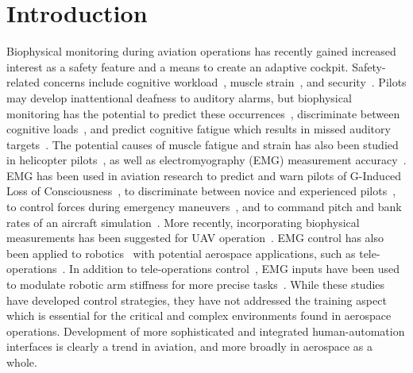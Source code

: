 \section{Introduction}
Biophysical monitoring during aviation operations has recently gained increased interest as a safety feature and a means to create an adaptive cockpit.
Safety-related concerns include cognitive workload~\cite{RN1, RN2}, muscle strain~\cite{RN3, RN4, RN5}, and security~\cite{RN6}.
Pilots may develop inattentional deafness to auditory alarms, but biophysical monitoring has the potential to predict these occurrences~\cite{RN7}, discriminate between cognitive loads~\cite{RN1}, and predict cognitive fatigue which results in missed auditory targets~\cite{RN2}.
The potential causes of muscle fatigue and strain has also been studied in helicopter pilots~\cite{RN3, RN4, RN5}, as well as electromyography (EMG) measurement accuracy~\cite{RN8}.
EMG has been used in aviation research to predict and warn pilots of G-Induced Loss of Consciousness~\cite{RN9, RN10}, to discriminate between novice and experienced pilots~\cite{RN11}, to control forces during emergency maneuvers~\cite{RN12}, and to command pitch and bank rates of an aircraft simulation~\cite{RN13}.
More recently, incorporating biophysical measurements has been suggested for UAV operation~\cite{RN14}.
EMG control has also been applied to robotics~\cite{RN15, RN16, RN17, RN18} with potential aerospace applications, such as tele-operations~\cite{RN19}.
In addition to tele-operations control~\cite{RN20, RN21}, EMG inputs have been used to modulate robotic arm stiffness for more precise tasks~\cite{RN22, RN23}.
While these studies have developed control strategies, they have not addressed the training aspect which is essential for the critical and complex environments found in aerospace operations.
Development of more sophisticated and integrated human-automation interfaces is clearly a trend in aviation, and more broadly in aerospace as a whole.

